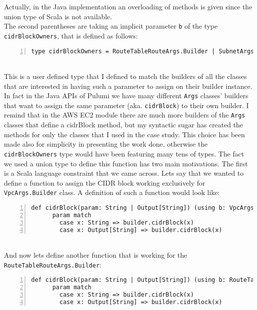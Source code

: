 Actually, in the Java implementation an overloading of methods is given since the union type of Scala is not available.\\
The second parentheses are taking an implicit parameter \texttt{b} of the type \texttt{cidrBlockOwners}, that is defined as follows:
\begin{lstlisting}[numbers=left, numberstyle=\tiny, numbersep=-5pt, stepnumber=1, linewidth=420pt]
  type cidrBlockOwners = RouteTableRouteArgs.Builder | SubnetArgs.Builder | VpcArgs.Builder
\end{lstlisting}\mbox{}\\
This is a user defined type that I defined to match the builders of all the  classes that are interested in having such a parameter to assign on their builder instance.
In fact in the Java APIs of Pulumi we have many different \texttt{Args} classes' builders that want to assign the same parameter (aka. \texttt{cidrBlock}) to their own builder.
I remind that in the AWS EC2 module there are much more builders of the \texttt{Args} classes that define a cidrBlock method, but my syntactic sugar has created the methods for only the classes that I used in the case study.
This choice has been made also for simplicity in presenting the work done, otherwise the \texttt{cidrBlockOwners} type would have been featuring many tens of types.
The fact we used a union type to define this function has two main motivations.
The first is a Scala language constraint that we came across.
Lets say that we wanted to define a function to assign the CIDR block working exclusively for \texttt{VpcArgs.Builder} class.
A definition of such a function would look like:
\begin{lstlisting}[numbers=left, numberstyle=\tiny, numbersep=-5pt, stepnumber=1, linewidth=420pt]
  def cidrBlock(param: String | Output[String]) (using b: VpcArgs.Builder): Unit =
      param match
        case x: String => builder.cidrBlock(x)
        case x: Output[String] => builder.cidrBlock(x)
\end{lstlisting}\mbox{}\\
And now lets define another function that is working for the \texttt{RouteTableRouteArgs.Builder}:
\begin{lstlisting}[numbers=left, numberstyle=\tiny, numbersep=-5pt, stepnumber=1, linewidth=420pt]
  def cidrBlock(param: String | Output[String]) (using b: RouteTableRouteArgs.Builder): Unit =
      param match
        case x: String => builder.cidrBlock(x)
        case x: Output[String] => builder.cidrBlock(x)
\end{lstlisting}\mbox{}\\
